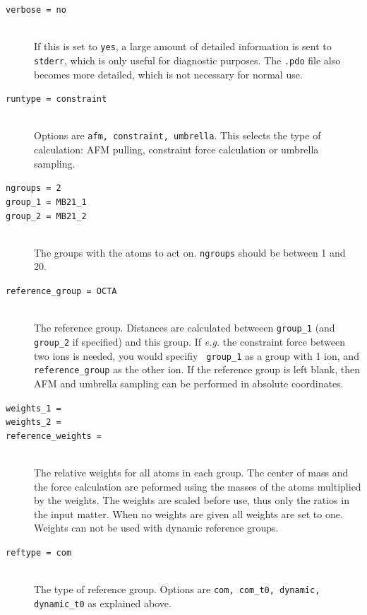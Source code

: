 \begin{description}

\item[\tt verbose                  = no]\mbox{}\\
If this is set to {\tt yes}, a large amount of detailed information
is sent to {\tt stderr}, which is only useful for diagnostic
purposes. The {\tt .pdo} file also becomes more detailed, which is not
necessary for normal use.

\item[\tt runtype                  = constraint]\mbox{}\\
Options are {\tt afm, constraint, umbrella}. This selects
the type of calculation: AFM pulling, constraint force calculation
or umbrella sampling.

\item[\tt ngroups                   = 2]
\item[\tt group\_1                  = MB21\_1]
\item[\tt group\_2                  = MB21\_2]\mbox{}\\
The groups with the atoms to act on. {\tt ngroups} should be between
1 and 20.

\item[\tt reference\_group          = OCTA]\mbox{}\\
The reference group. Distances are calculated betweeen {\tt group\_1}
(and {\tt group\_2} if specified) and this group. If \emph{e.g.} the
constraint force between two ions is needed, you would specifiy {\tt
group\_1} as a group with 1 ion, and {\tt reference\_group} as the other
ion. If the reference group is left blank, then AFM and umbrella sampling
can be performed in absolute coordinates.

\item[\tt weights\_1                  = ]
\item[\tt weights\_2                  = ]
\item[\tt reference\_weights          = ]\mbox{}\\
The relative weights for all atoms in each group.
The center of mass and the force calculation are peformed using
the masses of the atoms multiplied by the weights.
The weights are scaled before use, thus only the ratios in the input matter.
When no weights are given all weights are set to one.
Weights can not be used with dynamic reference groups.

\item[\tt reftype                  = com]\mbox{}\\
The type of reference group. Options are {\tt com, com\_t0, dynamic,
dynamic\_t0} as explained above. 


\end{description}
